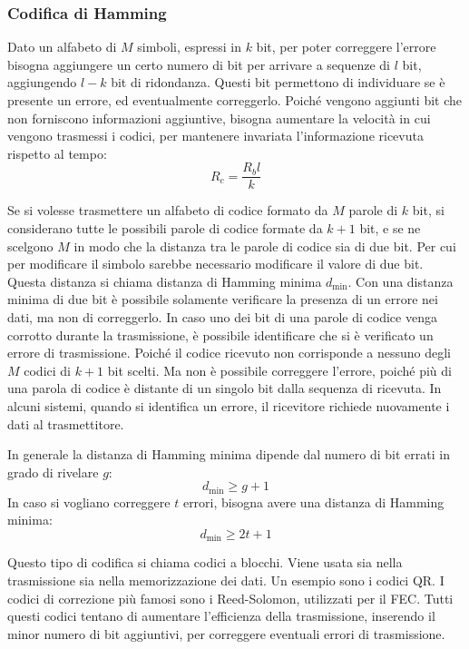 \documentclass{article}
\numberwithin{equation}{subsection}
\begin{document}
\subsubsection{Codifica di Hamming}

Dato un alfabeto di $M$ simboli, espressi in $k$ bit, per poter correggere l'errore bisogna aggiungere un certo numero di bit per arrivare a sequenze di $l$ bit, 
aggiungendo $l-k$ bit di ridondanza. Questi bit permettono di individuare se è presente un errore, ed eventualmente correggerlo. Poiché vengono aggiunti bit 
che non forniscono informazioni aggiuntive, bisogna aumentare la velocità in cui vengono trasmessi i codici, per mantenere 
invariata l'informazione ricevuta rispetto al tempo:
\begin{equation}
    R_c=\displaystyle\frac{R_bl}{k}
\end{equation}

Se si volesse trasmettere un alfabeto di codice formato da $M$ parole di $k$ bit, si considerano tutte le possibili parole di codice formate da $k+1$ bit, e se ne 
scelgono $M$ in modo che la distanza tra le parole di codice sia di due bit. Per cui per modificare il simbolo sarebbe necessario modificare il valore di due bit. 
Questa distanza si chiama distanza di Hamming minima $d_{\min}$. Con una distanza minima di due bit è possibile solamente verificare la presenza di un errore nei 
dati, ma non di correggerlo. 
In caso uno dei bit di una parole di codice venga corrotto durante la trasmissione, è possibile identificare che si è verificato un errore di trasmissione. Poiché 
il codice ricevuto non corrisponde a nessuno degli $M$ codici di $k+1$ bit scelti. Ma non è possibile correggere l'errore, poiché più di una parola di codice è 
distante di un singolo bit dalla sequenza di ricevuta. 
In alcuni sistemi, quando si identifica un errore, il ricevitore richiede nuovamente i dati al trasmettitore. 

In generale la distanza di Hamming minima dipende dal numero di bit errati in grado di rivelare $g$:
\begin{equation}
    d_{\min}\geq g+1
\end{equation}
In caso si vogliano correggere $t$ errori, bisogna avere una distanza di Hamming minima:
\begin{equation}
    d_{\min}\geq 2t+1
\end{equation}

Questo tipo di codifica si chiama codici a blocchi. Viene usata sia nella trasmissione sia nella memorizzazione dei dati. Un esempio sono i codici QR. I codici di correzione 
più famosi sono i Reed-Solomon, utilizzati per il FEC. 
Tutti questi codici tentano di aumentare l'efficienza della trasmissione, inserendo il minor numero di bit aggiuntivi, per correggere eventuali errori di trasmissione.  

\clearpage
\end{document}
